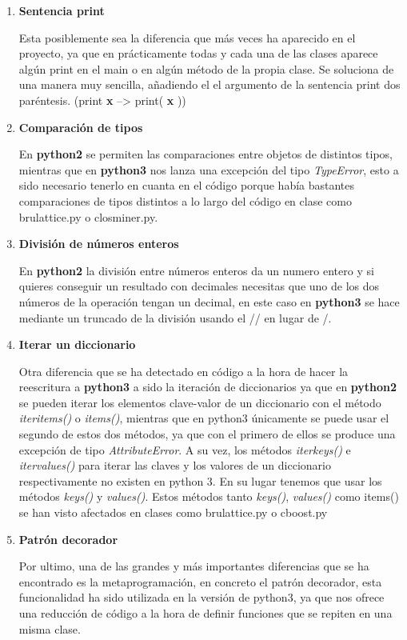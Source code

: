 \documentclass{cosas/tfg_domingo}
\begin{document}
\begin{enumerate}
    \item \textbf{Sentencia print}
    
    Esta posiblemente sea la diferencia que más veces ha aparecido en el proyecto, ya que en prácticamente todas y cada una de las clases aparece algún print en el main o en algún método de la propia clase.
    Se soluciona de una manera muy sencilla, añadiendo el el argumento de la sentencia print dos paréntesis. (print \textbf{x} --> print( \textbf{x} ))
    
    \item \textbf{Comparación de tipos}
    
    En \textbf{python2} se permiten las comparaciones entre objetos de distintos tipos, mientras que en \textbf{python3} nos lanza una excepción del tipo \textit{TypeError}, esto a sido necesario tenerlo en cuanta en el código porque había bastantes comparaciones de tipos distintos a lo largo del código en clase como brulattice.py o closminer.py.
    
    \item \textbf{División de números enteros}
    
    En \textbf{python2} la división entre números enteros da un numero entero y si quieres conseguir un resultado con decimales necesitas que uno de los dos números de la operación tengan un decimal, en este caso en \textbf{python3} se hace mediante un truncado de la división usando el // en lugar de /.
    
    \item \textbf{Iterar un diccionario}
    
    Otra diferencia que se ha detectado en código a la hora de hacer la reescritura a \textbf{python3} a sido la iteración de diccionarios ya que en \textbf{python2} se pueden iterar los elementos clave-valor de un diccionario con el método \textit{iteritems()} o \textit{items()}, mientras que en python3 únicamente se puede usar el segundo de estos dos métodos, ya que con el primero de ellos se produce una excepción de tipo \textit{AttributeError}.
    A su vez, los métodos \textit{iterkeys()} e \textit{itervalues()} para iterar las claves y los valores de un diccionario respectivamente no existen en python 3. En su lugar tenemos que usar los métodos \textit{keys()} y \textit{values()}. Estos métodos tanto \textit{keys()}, \textit{values()} como items() se han visto afectados en clases como brulattice.py o cboost.py
    
    \item \textbf{Patrón decorador}
    
    Por ultimo, una de las grandes y más importantes diferencias que se ha encontrado es la metaprogramación, en concreto el patrón decorador, esta funcionalidad ha sido utilizada en la versión de python3, ya que nos ofrece una reducción de código a la hora de definir funciones que se repiten en una misma clase.
    
\end{enumerate}
\newpage
\end{document}
